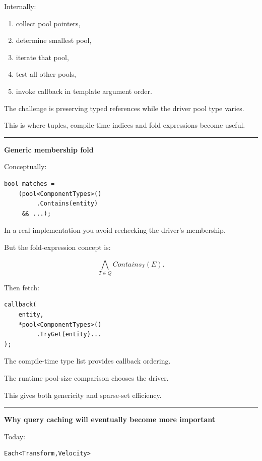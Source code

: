 Internally:

\begin{enumerate}
\def\labelenumi{\arabic{enumi}.}
\tightlist
\item
  collect pool pointers,
\item
  determine smallest pool,
\item
  iterate that pool,
\item
  test all other pools,
\item
  invoke callback in template argument order.
\end{enumerate}

The challenge is preserving typed references while the driver pool type varies.

This is where tuples, compile-time indices and fold expressions become useful.

\begin{center}\rule{0.5\linewidth}{0.5pt}\end{center}

\textbf{Generic membership fold}

Conceptually:

\begin{verbatim}
bool matches =
    (pool<ComponentTypes>()
         .Contains(entity)
     && ...);
\end{verbatim}

In a real implementation you avoid rechecking the driver's membership.

But the fold-expression concept is:

\[
\bigwedge_{T\in Q}
Contains_T(E).
\]

Then fetch:

\begin{verbatim}
callback(
    entity,
    *pool<ComponentTypes>()
         .TryGet(entity)...
);
\end{verbatim}

The compile-time type list provides callback ordering.

The runtime pool-size comparison chooses the driver.

This gives both genericity and sparse-set efficiency.

\begin{center}\rule{0.5\linewidth}{0.5pt}\end{center}

\textbf{Why query caching will eventually become more important}

Today:

\begin{verbatim}
Each<Transform,Velocity>
\end{verbatim}

